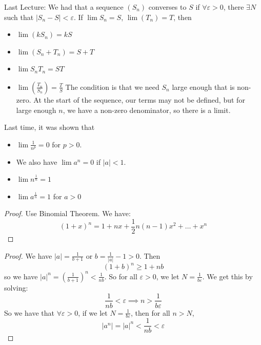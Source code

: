 \documentclass{report}
\begin{document}
Last Lecture: We had that a sequence $(S_{n})$ converses to $S$ if $\forall \varepsilon > 0$, there $\exists N$ such that $\lvert S_{n} - S \rvert < \varepsilon$. If $\lim S_{n} = S$, $\lim (T_{n}) = T$, then 
    \begin{itemize}
        \item  $\lim (kS_{n}) = kS$

        \item  $\lim (S_{n} + T_{n}) = S + T$

        \item $\lim S_{n}T_{n} = ST$

        \item $\lim (\frac{T_{n}}{S_{n}}) = \frac{T}{S}$ The condition is that we need $S_{n}$ large enough that is non-zero. At the start of the sequence, our terms may not be defined, but for large enough $n$, we have a non-zero denominator, so there is a limit.
    \end{itemize}
Last time, it was shown that 
    \begin{itemize}
        \item $\lim \frac{1}{n^{p}}= 0$ for $p > 0$.

        \item We also have $\lim a^{n} = 0$ if $\lvert a \rvert < 1$.

        \item $\lim n^{\frac{1}{n}} = 1$

        \item $\lim a^{\frac{1}{n}} = 1$ for $a > 0$
    \end{itemize}  
\begin{proof}
    Use Binomial Theorem. We have:
        \begin{equation*}
            (1 + x)^{n} = 1 + nx + \dfrac{1}{2}n(n - 1)x^{2} + \ldots + x^{n}
        \end{equation*}
\end{proof}
\begin{proof}
    We have $\lvert a \rvert = \frac{1}{b + 1}$ or $b = \frac{1}{\lvert a \rvert} - 1 > 0$. Then 
        \begin{equation*}
            (1 + b)^{n} \geq 1 + nb
        \end{equation*}
    so we have $\lvert a \rvert^{n} = (\frac{1}{b + 1})^{n} < \frac{1}{nb}$. So for all $\varepsilon > 0$, we let $N = \frac{1}{b\varepsilon}$. We get this by solving:
        \begin{equation*}
            \dfrac{1}{nb} < \varepsilon \implies n >  \dfrac{1}{b\varepsilon}
        \end{equation*}
    So we have that $\forall \varepsilon >  0$, if we let $N = \frac{1}{b \varepsilon}$, then for all $n > N$, 
        \begin{equation*}
            \lvert a^{n} \rvert = \lvert a \rvert^{n} < \dfrac{1}{nb} < \varepsilon
        \end{equation*}
\end{proof}
\end{document}
